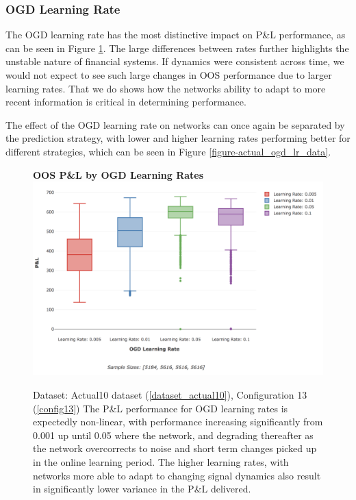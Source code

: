 \documentclass[a4paper,11pt,oneside]{article}
\theoremstyle{plain}
\theoremstyle{definition}
\begin{document}
	\subsubsection{OGD Learning Rate}
	
	The OGD learning rate has the most distinctive impact on P\&L performance, as can be seen in Figure \ref{figure-actual_ogd_lr}. The large differences between rates further highlights the unstable nature of financial systems. If dynamics were consistent across time, we would not expect to see such large changes in OOS performance due to larger learning rates. That we do shows how the networks ability to adapt to more recent information is critical in determining performance. \newline
	
	The effect of the OGD learning rate on networks can once again be separated by the prediction strategy, with lower and higher learning rates performing better for different strategies, which can be seen in Figure \ref{figure-actual_ogd_lr_data}.\newline
	
	\begin{figure}[H]
		\textbf{OOS P\&L by OGD Learning Rates}
		\centering
		\includegraphics[scale=0.45]{images/results/network/lr/actual_ogd_lr.png}
		\caption[P\&L by OGD Learning Rates]{Dataset: Actual10 dataset (\ref{dataset_actual10}), Configuration 13 (\ref{config13})
			\newline The P\&L performance for OGD learning rates is expectedly non-linear, with performance increasing significantly from 0.001 up until 0.05 where the network, and degrading thereafter as the network overcorrects to noise and short term changes picked up in the online learning period. The higher learning rates, with networks more able to adapt to changing signal dynamics also result in significantly lower variance in the P\&L delivered. }
		\label{figure-actual_ogd_lr}
	\end{figure}
\end{document}
